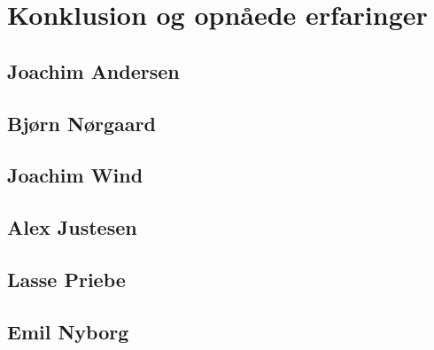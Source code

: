 \chapter{Konklusion og opnåede erfaringer}

\section{Joachim Andersen}

\section{Bjørn Nørgaard}

\section{Joachim Wind}

\section{Alex Justesen}

\section{Lasse Priebe}

\section{Emil Nyborg}


